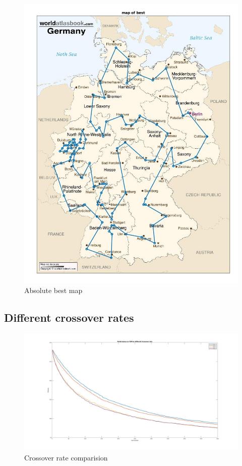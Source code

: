 \documentclass[a4paper, 12pt]{article}
\begin{document}
\begin{figure}[h!]
  \centering
  \includegraphics[width=1.0\textwidth]{images/BestPath_ultimate.jpg}
    \caption{Absolute best map \label{fig:xxx1}}
\end{figure}

\newpage
\subsection{Different crossover rates}

\begin{figure}[ht!]
	\centering
	\includegraphics[width=1.0\textwidth]{images/crossover_exp_98.jpg}
	\caption{Crossover rate comparision\label{fig:crossfig}}
\end{figure}
\end{document}
